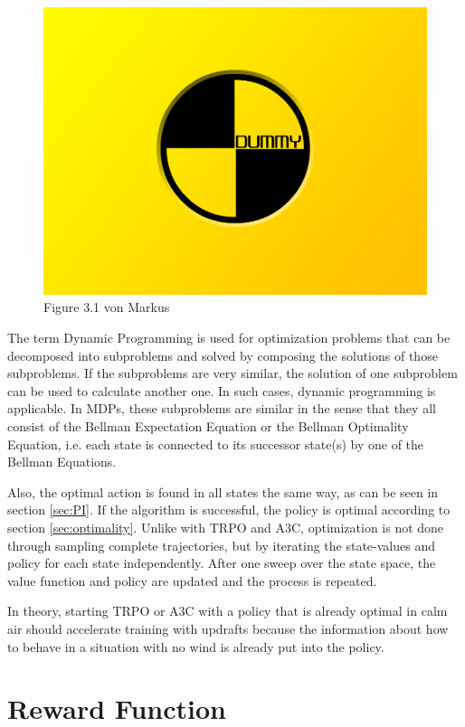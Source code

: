 \begin{figure}[h]
	\includegraphics[width=\textwidth]{src/pics/dummy.jpg}
	\caption{Figure 3.1 von Markus}
	\label{fig:model-based-model-free} 
\end{figure}

The term Dynamic Programming is used for optimization problems that can be decomposed into subproblems and solved by composing the solutions of those subproblems. If the subproblems are very similar, the solution of one subproblem can be used to calculate another one. In such cases, dynamic programming is applicable. In MDPs, these subproblems are similar in the sense that they all consist of the Bellman Expectation Equation or the Bellman Optimality Equation, i.e. each state is connected to its successor state(s) by one of the Bellman Equations.

Also, the optimal action is found in all states the same way, as can be seen in section \ref{sec:PI}. If the algorithm is successful, the policy is optimal according to section \ref{sec:optimality}. Unlike with TRPO and A3C, optimization is not done through sampling complete trajectories, but by iterating the state-values and policy for each state independently. After one sweep over the state space, the value function and policy are updated and the process is repeated.\bigbreak

In theory, starting TRPO or A3C with a policy that is already optimal in calm air should accelerate training with updrafts because the information about how to behave in a situation with no wind is already put into the policy.

\section{Reward Function}
\label{sec:reward}

